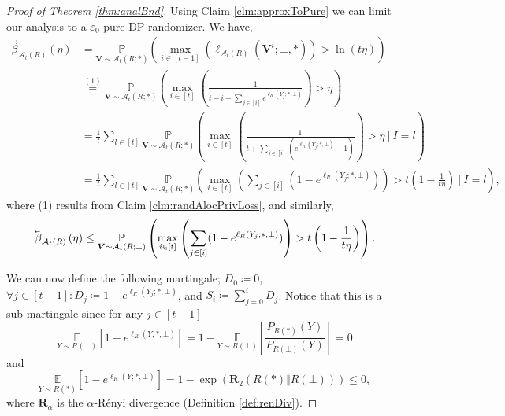 \documentclass{article}
\newcommand{\mainThmAsym}{thm:analBnd}
\newcommand{\mainThmAsym}{thm:asymBnd}
\theoremstyle{plain}
\theoremstyle{definition}
\newcommand{\eps}{\varepsilon}
\newcommand{\eqExp}[2]{\overset{(#1)}{#2}}
\newcommand{\lvec}[1]{\reflectbox{$\vec{\reflectbox{$#1$}}$}}
\newcommand{\outRV}{Y}
\newcommand{\rand}{R}
\newcommand{\viewRV}{\boldsymbol{V}}
\newcommand{\prob}[2]{\underset{#1}{\mathbb{P}} \left(#2 \right)}
\newcommand{\expect}[2]{\underset{#1}{\mathbb{E}} \left[#2 \right]}
\newcommand{\lossAlg}[4]{\ell_{#1}\left(#2; #3, #4 \right)}
\newcommand{\Renyi}[1]{\boldsymbol{R}_{#1}}
\newcommand{\RenyiDiv}[3]{\Renyi{#1}\left(#2 \Vert #3 \right)}
\newcommand{\alloc}[2]{\mathcal{A}_{#1}\left(#2\right)}
\newcommand{\allocFunc}[3]{\mathcal{A}_{#1}\left(#2; #3\right)}
\newcommand{\add}[1]{\lvec{#1}}
\newcommand{\rem}[1]{\vec{#1}}
\begin{document}
\begin{proof}[Proof of Theorem \ref{\mainThmAsym}]
    Using Claim \ref{clm:approxToPure} we can limit our analysis to a $\eps_{0}$-pure DP randomizer. We have,
    \begin{align*}
        \rem{\beta}_{\alloc{t}{\rand}}\left(\eta \right) & = \prob{\viewRV \sim \allocFunc{t}{\rand}{*}}{\underset{i \in [t-1]}{\max} \left(\lossAlg{\alloc{t}{\rand}}{\viewRV^{i}}{\bot}{*} \right)> \ln(t \eta)}
        \\ & \eqExp{1}{=} \prob{\viewRV \sim \allocFunc{t}{\rand}{*}}{\underset{i \in [t]}{\max}\left(\frac{1}{t-i + \sum_{j \in [i]} e^{\lossAlg{\rand}{\outRV_{j}}{*}{\bot}}} \right) > \eta}
        \\ & = \frac{1}{t} \sum_{l \in [t]} \prob{\viewRV \sim \allocFunc{t}{\rand}{*}}{\underset{i \in [t]}{\max}\left(\frac{1}{t + \sum_{j \in [i]} \left(e^{\lossAlg{\rand}{\outRV_{j}}{*}{\bot}} - 1\right)}\right) > \eta ~ \vert ~ I=l}
        \\ & = \frac{1}{t} \sum_{l \in [t]} \prob{\viewRV \sim \allocFunc{t}{\rand}{*}}{\underset{i \in [t]}{\max}\left(\sum_{j \in [i]} \left(1 - e^{\lossAlg{\rand}{\outRV_{j}}{*}{\bot}}\right)\right) > t\left(1 - \frac{1}{t \eta}\right) ~ \vert ~ I=l},
    \end{align*}
    where (1) results from Claim \ref{clm:randAlocPrivLoss}, and similarly,
    \[
        \add{\beta}_{\alloc{t}{\rand}}\left(\eta \right) \le \prob{\viewRV \sim \allocFunc{t}{\rand}{\bot}}{\underset{i \in [t]}{\max}\left(\sum_{j \in [i]} (1 - e^{\lossAlg{\rand}{\outRV_{j}}{*}{\bot}})\right) > t\left(1 - \frac{1}{t \eta}\right)}.
    \]

    We can now define the following martingale; $D_{0} \coloneqq 0$, $\forall j \in [t-1] : D_{j} \coloneqq 1 - e^{\lossAlg{\rand}{\outRV_{j}}{*}{\bot}}$, and $S_{i} \coloneqq \sum_{j = 0}^{i} D_{j}$. Notice that this is a sub-martingale since for any $j \in [t-1]$
    \[
        \expect{\outRV \sim \rand(\bot)}{1 - e^{\lossAlg{\rand}{\outRV}{*}{\bot}}} = 1 - \expect{\outRV \sim \rand(\bot)}{\frac{P_{\rand(*)}(\outRV)}{P_{\rand(\bot)}(\outRV)}} = 0
    \]
    and 
    \[
        \expect{\outRV \sim \rand(*)}{1 - e^{\lossAlg{\rand}{\outRV}{*}{\bot}}} = 1 - \exp\left(\RenyiDiv{2}{\rand(*)}{\rand(\bot)} \right) \le 0, 
    \]
    where $\Renyi{\alpha}$ is the $\alpha$-R\'{e}nyi divergence (Definition \ref{def:renDiv}).
    

\end{proof}
\end{document}
